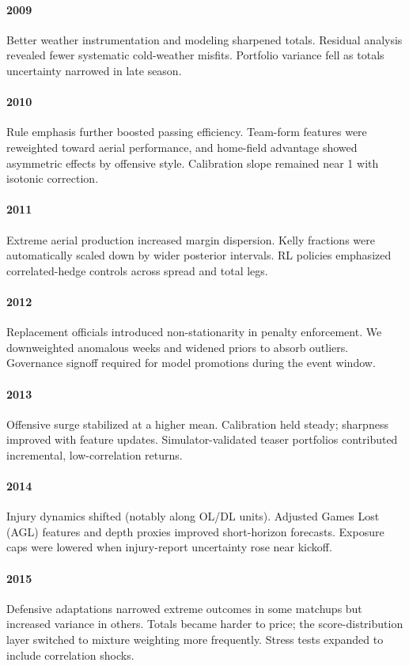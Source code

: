 \documentclass[12pt]{report}  %
\numberwithin{equation}{section}
\theoremstyle{plain}
\theoremstyle{definition}
\theoremstyle{remark}
\begin{document}
\paragraph{2009} Better weather instrumentation and modeling sharpened totals. Residual analysis revealed fewer systematic cold-weather misfits. Portfolio variance fell as totals uncertainty narrowed in late season.

\paragraph{2010} Rule emphasis further boosted passing efficiency. Team-form features were reweighted toward aerial performance, and home-field advantage showed asymmetric effects by offensive style. Calibration slope remained near 1 with isotonic correction.

\paragraph{2011} Extreme aerial production increased margin dispersion. Kelly fractions were automatically scaled down by wider posterior intervals. RL policies emphasized correlated-hedge controls across spread and total legs.

\paragraph{2012} Replacement officials introduced non-stationarity in penalty enforcement. We downweighted anomalous weeks and widened priors to absorb outliers. Governance signoff required for model promotions during the event window.

\paragraph{2013} Offensive surge stabilized at a higher mean. Calibration held steady; sharpness improved with feature updates. Simulator-validated teaser portfolios contributed incremental, low-correlation returns.

\paragraph{2014} Injury dynamics shifted (notably along OL/DL units). Adjusted Games Lost (AGL) features and depth proxies improved short-horizon forecasts. Exposure caps were lowered when injury-report uncertainty rose near kickoff.

\paragraph{2015} Defensive adaptations narrowed extreme outcomes in some matchups but increased variance in others. Totals became harder to price; the score-distribution layer switched to mixture weighting more frequently. Stress tests expanded to include correlation shocks.
\end{document}
